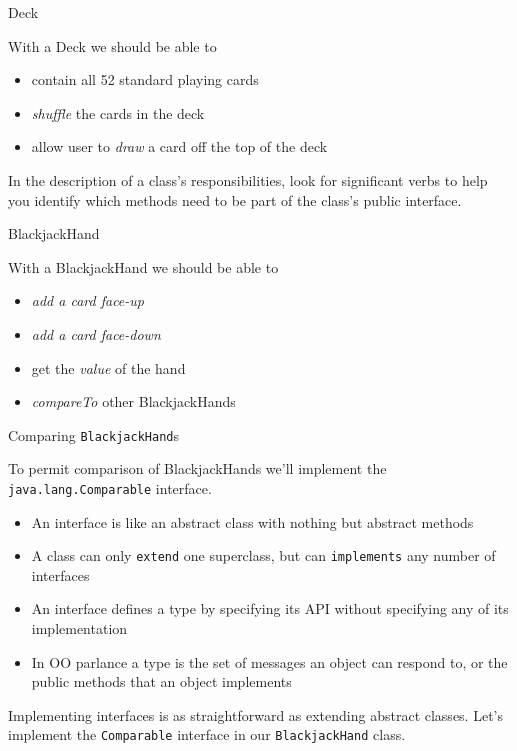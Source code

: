 \documentclass{beamer}
\begin{document}
\begin{frame}[fragile]{Deck}


With a Deck we should be able to
\begin{itemize}
\item contain all 52 standard playing cards
\item {\it shuffle} the cards in the deck
\item allow user to {\it draw} a card off the top of the deck
\end{itemize}

In the description of a class's responsibilities, look for significant verbs to help you identify which methods need to be part of the class's public interface.

\end{frame}

\begin{frame}[fragile]{BlackjackHand}


With a BlackjackHand we should be able to
\begin{itemize}
\item {\it add a card face-up}
\item {\it add a card face-down}
\item get the {\it value} of the hand
\item {\it compareTo} other BlackjackHands
\end{itemize}


\end{frame}

\begin{frame}[fragile]{Comparing {\tt BlackjackHand}s}


To permit comparison of BlackjackHands we'll implement the {\tt java.lang.Comparable} interface.
\begin{itemize}
\item An interface is like an abstract class with nothing but abstract methods
\item A class can only {\tt extend} one superclass, but can {\tt implements} any number of interfaces
\item An interface defines a type by specifying its API without specifying any of its implementation
\item In OO parlance a type is the set of messages an object can respond to, or the public methods that an object implements
\end{itemize}

Implementing interfaces is as straightforward as extending abstract classes.  Let's implement the {\tt Comparable} interface in our {\tt BlackjackHand} class.

\end{frame}
\end{document}
